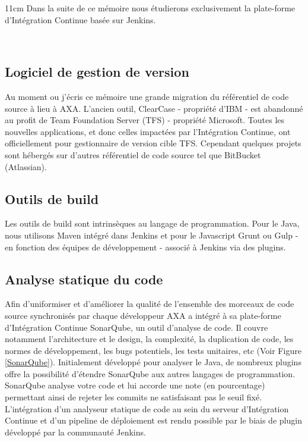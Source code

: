     \begin {boxedminipage} {11cm}
      Dans la suite de ce mémoire nous étudierons exclusivement la plate-forme d'Intégration Continue basée sur Jenkins.
    \end {boxedminipage}\\

    \subsection{Logiciel de gestion de version}
    Au moment ou j'écris ce mémoire une grande migration du référentiel de code source à lieu à AXA. L'ancien outil, ClearCase - propriété d'IBM - est abandonné au profit de Team Foundation Server (TFS) - propriété Microsoft. Toutes les nouvelles applications, et donc celles impactées par l'Intégration Continue, ont officiellement pour gestionnaire de version cible TFS. Cependant quelques projets sont hébergés sur d'autres référentiel de code source tel que BitBucket (Atlassian).

    \subsection{Outils de build}
    Les outils de build sont intrinsèques au langage de programmation. Pour le Java, nous utilisons Maven intégré dans Jenkins et pour le Javascript Grunt ou Gulp - en fonction des équipes de développement - associé à Jenkins via des plugins.

    \subsection{Analyse statique du code}
    Afin d'uniformiser et d'améliorer la qualité de l'ensemble des morceaux de code source synchronisés par chaque développeur AXA a intégré à sa plate-forme d'Intégration Continue SonarQube, un outil d'analyse de code. Il couvre notamment l'architecture et le design, la complexité, la duplication de code, les normes de développement, les bugs potentiels, les tests unitaires, etc (Voir Figure \ref{SonarQube}). Initialement développé pour analyser le Java, de nombreux plugins offre la possibilité d'étendre SonarQube aux autres langages de programmation. SonarQube analyse votre code et lui accorde une note (en pourcentage) permettant ainsi de rejeter les commits ne satisfaisant pas le seuil fixé.\\

    L'intégration d'un analyseur statique de code au sein du serveur d'Intégration Continue et d'un pipeline de déploiement est rendu possible par le biais de plugin développé par la communauté Jenkins.


